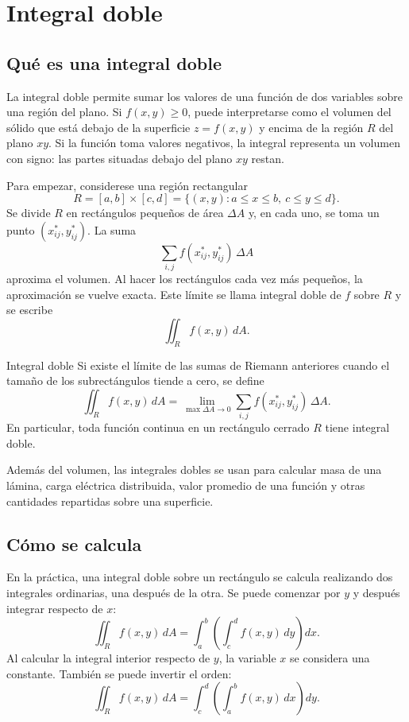 \section{Integral doble}

\subsection{Qué es una integral doble}

La integral doble permite sumar los valores de una función de dos variables sobre una región del plano. Si $f(x,y)\geq 0$, puede interpretarse como el volumen del sólido que está debajo de la superficie $z=f(x,y)$ y encima de la región $R$ del plano $xy$. Si la función toma valores negativos, la integral representa un volumen con signo: las partes situadas debajo del plano $xy$ restan.

Para empezar, considerese una región rectangular
\[
R=[a,b]\times[c,d]=\{(x,y):a\leq x\leq b,\ c\leq y\leq d\}.
\]
Se divide $R$ en rectángulos pequeños de área $\Delta A$ y, en cada uno, se toma un punto $(x_{ij}^*,y_{ij}^*)$. La suma
\[
\sum_{i,j} f(x_{ij}^*,y_{ij}^*)\,\Delta A
\]
aproxima el volumen. Al hacer los rectángulos cada vez más pequeños, la aproximación se vuelve exacta. Este límite se llama integral doble de $f$ sobre $R$ y se escribe
\[
\iint_R f(x,y)\,dA.
\]

\begin{mydefinition}{Integral doble}
Si existe el límite de las sumas de Riemann anteriores cuando el tamaño de los subrectángulos tiende a cero, se define
\[
\iint_R f(x,y)\,dA
=\lim_{\max\Delta A\to 0}\sum_{i,j}f(x_{ij}^*,y_{ij}^*)\,\Delta A.
\]
En particular, toda función continua en un rectángulo cerrado $R$ tiene integral doble.
\end{mydefinition}

Además del volumen, las integrales dobles se usan para calcular masa de una lámina, carga eléctrica distribuida, valor promedio de una función y otras cantidades repartidas sobre una superficie.

\subsection{Cómo se calcula}

En la práctica, una integral doble sobre un rectángulo se calcula realizando dos integrales ordinarias, una después de la otra. Se puede comenzar por $y$ y después integrar respecto de $x$:
\[
\iint_R f(x,y)\,dA
=\int_a^b\left(\int_c^d f(x,y)\,dy\right)dx.
\]
Al calcular la integral interior respecto de $y$, la variable $x$ se considera una constante. También se puede invertir el orden:
\[
\iint_R f(x,y)\,dA
=\int_c^d\left(\int_a^b f(x,y)\,dx\right)dy.
\]

